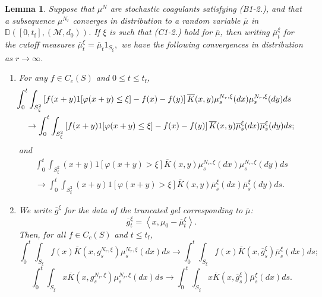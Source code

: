 \documentclass[11pt, notitlepage]{article}
\newtheorem{lem}[thm]{Lemma}
\begin{document}
\begin{lem}\label{lemma: convergences in distribution}
Suppose that $\mu^N$ are stochastic coagulants satisfying (B1-2.), and that a subsequence  $\mu^{N_r}$ converges in distribution to a random variable $\overline{\mu}$ in $\mathbb{D}([0,t_\mathrm{f}],(\mathcal{M},d_0))$. If $\xi$ is such that (C1-2.) hold for $\overline{\mu}$, then writing $\overline{\mu}^\xi_t$ for the cutoff measures $\overline{\mu}^\xi_t=\overline{\mu}_t1_{S_\xi},$ we have the following convergences in distribution as $r\rightarrow \infty$. 
\begin{enumerate}[label=\roman{*}).] \item
For any $f\in C_c(S)$ and $0\le t \le t_\mathrm{f}$,
\begin{multline}
    \hspace{-0.6cm}\int_0^t \int_{S_\xi^2}\left[f(x+y)1[\varphi(x+y) \leq \xi ] - f(x) - f(y)\right]
      \overline{K}(x,y)\mu^{N_r,\xi}_s(d x)\mu^{N_r,\xi}_s(d y)d s
    \\\rightarrow
    \int_0^t \int_{S_\xi^2}\left[f(x+y)1[\varphi(x+y) \leq \xi ] - f(x) - f(y)\right]
      \overline{K}(x,y)\overline{\mu}^\xi_s(d x)\overline{\mu}^\xi_s(d y)d s;
\end{multline}
and
\begin{multline}
    \int_0^t \int_{S_\xi^2}(x+y)1[\varphi(x+y) > \xi ]
      \overline{K}(x,y)\mu^{N_r,\xi}_s(d x)\mu^{N_r,\xi}_s(d y)d s
    \\\rightarrow
    \int_0^t \int_{S_\xi^2}(x+y)1[\varphi(x+y) > \xi ]
      \overline{K}(x,y)\overline{\mu}^\xi_s(d x)\overline{\mu}^\xi_s(d y)d s.
\end{multline}
\item We write $\overline{g}^\xi$ for the data of the truncated gel corresponding to $\overline{\mu}$: \begin{equation}\label{eq: cutoff gel overline g xi} \overline{g}^{\xi}_t = \left<x, \mu_0 -\overline{\mu}^\xi_t\right>.\end{equation}   Then, for all $f\in C_c(S)$ and $t\le t_\mathrm{f}$, \begin{equation}
    \int_0^t \int_{S_\xi}f(x) \overline{K}(x,g^{N_r,\xi}_s)\mu^{N_r,\xi}_s(d x)d s
    \rightarrow
    \int_0^t \int_{S_\xi}f(x) \overline{K}(x,\overline{g}^\xi_s)\overline{\mu}^\xi_s(d x)d s;
\end{equation}
\begin{equation}
    \int_0^t \int_{S_\xi}x \overline{K}(x,g^{N_r,\xi}_s)\mu^{N_r,\xi}_s(d x)d s \rightarrow \int_0^t \int_{S_\xi}x \overline{K}(x,\overline{g}^\xi_s)\overline{\mu}^\xi_s(d x)d s.

\end{equation}
\end{enumerate}
\end{lem}
\end{document}
